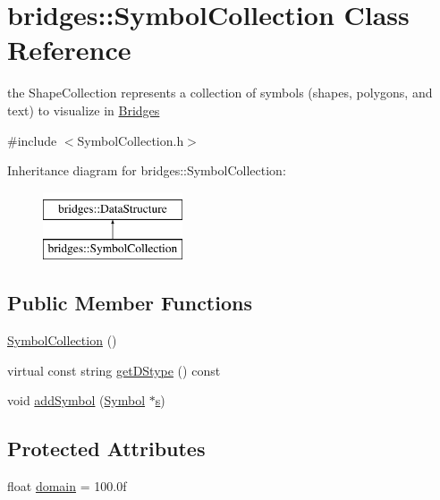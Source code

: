 \hypertarget{classbridges_1_1_symbol_collection}{}\section{bridges\+::Symbol\+Collection Class Reference}
\label{classbridges_1_1_symbol_collection}


the Shape\+Collection represents a collection of symbols (shapes, polygons, and text) to visualize in \mbox{\hyperlink{classbridges_1_1_bridges}{Bridges}}  




{\ttfamily \#include $<$Symbol\+Collection.\+h$>$}

Inheritance diagram for bridges\+::Symbol\+Collection\+:\begin{figure}[H]
\begin{center}
\leavevmode
\includegraphics[height=2.000000cm]{classbridges_1_1_symbol_collection}
\end{center}
\end{figure}
\subsection*{Public Member Functions}
\begin{DoxyCompactItemize}
\item 
\mbox{\hyperlink{classbridges_1_1_symbol_collection_ae3b3dd944594e1ebac451c0557a45f80}{Symbol\+Collection}} ()
\item 
virtual const string \mbox{\hyperlink{classbridges_1_1_symbol_collection_a9bc5abacaf6f90b2d013963311c8052e}{get\+D\+Stype}} () const
\item 
void \mbox{\hyperlink{classbridges_1_1_symbol_collection_acdc101f6651becc430e281ed967ddedf}{add\+Symbol}} (\mbox{\hyperlink{classbridges_1_1_symbol}{Symbol}} $\ast$\mbox{\hyperlink{namespacebridges_acfb0a4f7877d8f63de3e6862004c50eda03c7c0ace395d80182db07ae2c30f034}{s}})
\end{DoxyCompactItemize}
\subsection*{Protected Attributes}
\begin{DoxyCompactItemize}
\item 
float \mbox{\hyperlink{classbridges_1_1_symbol_collection_a9387df86c54863524ab4779ff8458c7a}{domain}} = 100.\+0f
\end{DoxyCompactItemize}


